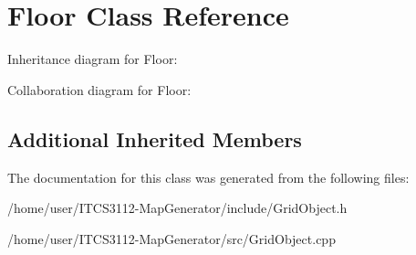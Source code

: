\hypertarget{classFloor}{}\section{Floor Class Reference}
\label{classFloor}


Inheritance diagram for Floor\+:


Collaboration diagram for Floor\+:
\subsection*{Additional Inherited Members}


The documentation for this class was generated from the following files\+:\begin{DoxyCompactItemize}
\item 
/home/user/\+I\+T\+C\+S3112-\/\+Map\+Generator/include/Grid\+Object.\+h\item 
/home/user/\+I\+T\+C\+S3112-\/\+Map\+Generator/src/Grid\+Object.\+cpp\end{DoxyCompactItemize}
